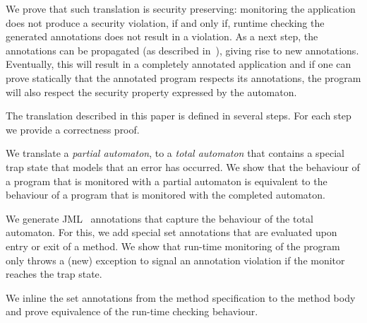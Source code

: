 We prove that such translation is security preserving: monitoring
the application does not produce a security violation,
if and only if, runtime checking
the generated annotations does not result in a violation.
As a next step, the annotations can be propagated (as described
in~\cite{PavlovaBBHL04}), giving rise to new annotations. Eventually,
this will result in a completely annotated application and if one can
prove statically that the annotated program respects its annotations,
the program will also respect the security property expressed by the automaton.

The translation described in this paper is defined in several
steps. For each step we provide a correctness proof.
\begin{inparaenum}
\item We translate a \emph{partial automaton}, to a \emph{total automaton}
that contains a special trap state that models that an error has occurred.
%
We show that the behaviour of a program that is monitored with a partial
automaton is equivalent to the behaviour of a program that is monitored with
the completed automaton.
\item We generate JML~\cite{LeavensPCCRCK05} annotations that capture the
behaviour of the total automaton.
For this, we add special \textsf{set} annotations that are evaluated
upon entry or exit of a method.
We show that run-time monitoring of the program
only throws a (new) exception to signal an annotation violation if the
monitor reaches the trap state.
\item We inline the \textsf{set} annotations from the method specification
to the method body and prove equivalence of the run-time checking behaviour.
\end{inparaenum}
